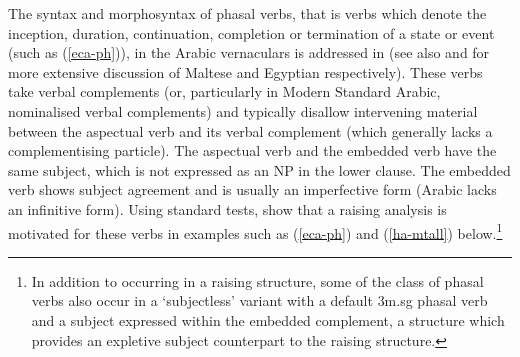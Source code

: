 \documentclass[output=paper,hidelinks]{langscibook}
\begin{document}






The  syntax and morphosyntax of phasal verbs, that is verbs which denote the inception, duration, continuation, completion or  termination of a state or event  (such as (\ref{eca-ph})), in the Arabic vernaculars is addressed in \citet{AACES:LFG13} (see also  \citealt{Camilleri:PhD16}  and \citealt{ElSadek:PhD} for more extensive discussion of Maltese and  Egyptian respectively). These verbs take verbal complements (or, particularly in Modern Standard Arabic, nominalised verbal complements)  and  typically disallow intervening material between the aspectual verb and its verbal complement (which generally lacks a complementising particle).  The
aspectual verb and the embedded verb
have the same subject, which is not expressed as an NP in the lower
clause. The  embedded verb shows subject agreement and is usually an
imperfective form (Arabic lacks an infinitive form). Using standard
tests, \citet{AACES:LFG13} show that a raising analysis is motivated
for these verbs in examples such as (\ref{eca-ph}) and (\ref{ha-mtall}) below.\footnote{In addition to occurring in a raising structure, some of the class of phasal verbs also occur in a `subjectless' variant with a default {\sc 3m.sg} phasal verb and a subject expressed  within the embedded complement, a structure which provides an expletive subject counterpart to the raising structure.}
\end{document}
